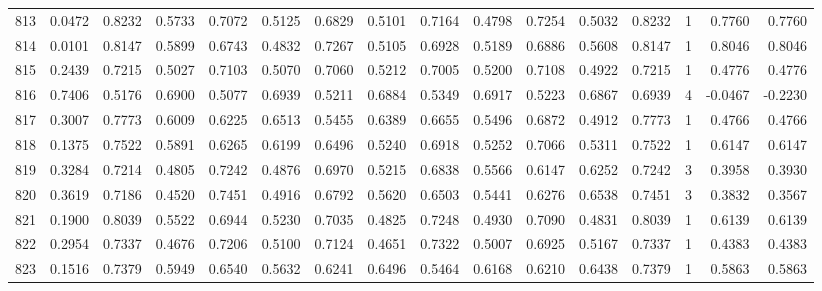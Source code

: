 \begin{tabular}{lrrrrrrrrrrrrrrr}
813 &      0.0472 &  0.8232 &  0.5733 &  0.7072 &  0.5125 &  0.6829 &  0.5101 &  0.7164 &  0.4798 &  0.7254 &   0.5032 &     0.8232 &      1 &                    0.7760 &                     0.7760 \\
814 &      0.0101 &  0.8147 &  0.5899 &  0.6743 &  0.4832 &  0.7267 &  0.5105 &  0.6928 &  0.5189 &  0.6886 &   0.5608 &     0.8147 &      1 &                    0.8046 &                     0.8046 \\
815 &      0.2439 &  0.7215 &  0.5027 &  0.7103 &  0.5070 &  0.7060 &  0.5212 &  0.7005 &  0.5200 &  0.7108 &   0.4922 &     0.7215 &      1 &                    0.4776 &                     0.4776 \\
816 &      0.7406 &  0.5176 &  0.6900 &  0.5077 &  0.6939 &  0.5211 &  0.6884 &  0.5349 &  0.6917 &  0.5223 &   0.6867 &     0.6939 &      4 &                   -0.0467 &                    -0.2230 \\
817 &      0.3007 &  0.7773 &  0.6009 &  0.6225 &  0.6513 &  0.5455 &  0.6389 &  0.6655 &  0.5496 &  0.6872 &   0.4912 &     0.7773 &      1 &                    0.4766 &                     0.4766 \\
818 &      0.1375 &  0.7522 &  0.5891 &  0.6265 &  0.6199 &  0.6496 &  0.5240 &  0.6918 &  0.5252 &  0.7066 &   0.5311 &     0.7522 &      1 &                    0.6147 &                     0.6147 \\
819 &      0.3284 &  0.7214 &  0.4805 &  0.7242 &  0.4876 &  0.6970 &  0.5215 &  0.6838 &  0.5566 &  0.6147 &   0.6252 &     0.7242 &      3 &                    0.3958 &                     0.3930 \\
820 &      0.3619 &  0.7186 &  0.4520 &  0.7451 &  0.4916 &  0.6792 &  0.5620 &  0.6503 &  0.5441 &  0.6276 &   0.6538 &     0.7451 &      3 &                    0.3832 &                     0.3567 \\
821 &      0.1900 &  0.8039 &  0.5522 &  0.6944 &  0.5230 &  0.7035 &  0.4825 &  0.7248 &  0.4930 &  0.7090 &   0.4831 &     0.8039 &      1 &                    0.6139 &                     0.6139 \\
822 &      0.2954 &  0.7337 &  0.4676 &  0.7206 &  0.5100 &  0.7124 &  0.4651 &  0.7322 &  0.5007 &  0.6925 &   0.5167 &     0.7337 &      1 &                    0.4383 &                     0.4383 \\
823 &      0.1516 &  0.7379 &  0.5949 &  0.6540 &  0.5632 &  0.6241 &  0.6496 &  0.5464 &  0.6168 &  0.6210 &   0.6438 &     0.7379 &      1 &                    0.5863 &                     0.5863 \\

\end{tabular}
